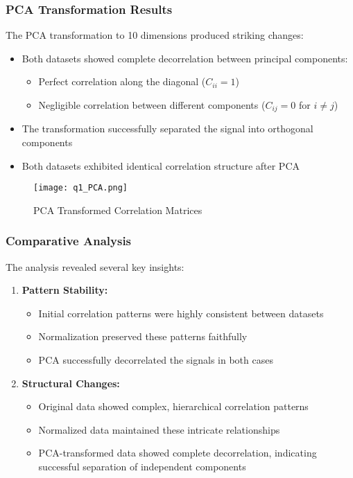 \documentclass[12pt]{article}
\begin{document}
\subsubsection{PCA Transformation Results}
The PCA transformation to 10 dimensions produced striking changes:
\begin{itemize}
    \item Both datasets showed complete decorrelation between principal components:
    \begin{itemize}
        \item Perfect correlation along the diagonal ($C_{ii} = 1$)
        \item Negligible correlation between different components ($C_{ij} = 0$ for $i \neq j$)
    \end{itemize}
    \item The transformation successfully separated the signal into orthogonal components
    \item Both datasets exhibited identical correlation structure after PCA
\end{itemize}
\begin{figure}[H]
    \centering
    \texttt{[image: q1\_PCA.png]}
    \caption{PCA Transformed Correlation Matrices}
    \label{fig:enter-label}
\end{figure}

\subsubsection{Comparative Analysis}
The analysis revealed several key insights:
\begin{enumerate}
    \item \textbf{Pattern Stability:}
    \begin{itemize}
        \item Initial correlation patterns were highly consistent between datasets
        \item Normalization preserved these patterns faithfully
        \item PCA successfully decorrelated the signals in both cases
    \end{itemize}
    
    \item \textbf{Structural Changes:}
    \begin{itemize}
        \item Original data showed complex, hierarchical correlation patterns
        \item Normalized data maintained these intricate relationships
        \item PCA-transformed data showed complete decorrelation, indicating successful separation of independent components
    \end{itemize}

\end{enumerate}
\end{document}
